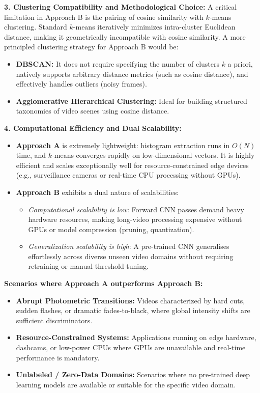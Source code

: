 \textbf{3. Clustering Compatibility and Methodological Choice:}
A critical limitation in Approach B is the pairing of cosine similarity with $k$-means clustering. Standard $k$-means iteratively minimizes intra-cluster Euclidean distance, making it geometrically incompatible with cosine similarity. A more principled clustering strategy for Approach B would be:
\begin{itemize}
    \item \textbf{DBSCAN:} It does not require specifying the number of clusters $k$ a priori, natively supports arbitrary distance metrics (such as cosine distance), and effectively handles outliers (noisy frames).
    \item \textbf{Agglomerative Hierarchical Clustering:} Ideal for building structured taxonomies of video scenes using cosine distance.
\end{itemize}

\textbf{4. Computational Efficiency and Dual Scalability:}
\begin{itemize}
    \item \textbf{Approach A} is extremely lightweight: histogram extraction runs in $O(N)$ time, and $k$-means converges rapidly on low-dimensional vectors. It is highly efficient and scales exceptionally well for resource-constrained edge devices (e.g., surveillance cameras or real-time CPU processing without GPUs).
    \item \textbf{Approach B} exhibits a dual nature of scalabilities: 
    \begin{itemize}
        \item \textit{Computational scalability is low}: Forward CNN passes demand heavy hardware resources, making long-video processing expensive without GPUs or model compression (pruning, quantization).
        \item \textit{Generalization scalability is high}: A pre-trained CNN generalises effortlessly across diverse unseen video domains without requiring retraining or manual threshold tuning.
    \end{itemize}
\end{itemize}

\textbf{Scenarios where Approach A outperforms Approach B:}
\begin{itemize}
    \item \textbf{Abrupt Photometric Transitions:} Videos characterized by hard cuts, sudden flashes, or dramatic fades-to-black, where global intensity shifts are sufficient discriminators.
    \item \textbf{Resource-Constrained Systems:} Applications running on edge hardware, dashcams, or low-power CPUs where GPUs are unavailable and real-time performance is mandatory.
    \item \textbf{Unlabeled / Zero-Data Domains:} Scenarios where no pre-trained deep learning models are available or suitable for the specific video domain.
\end{itemize}

